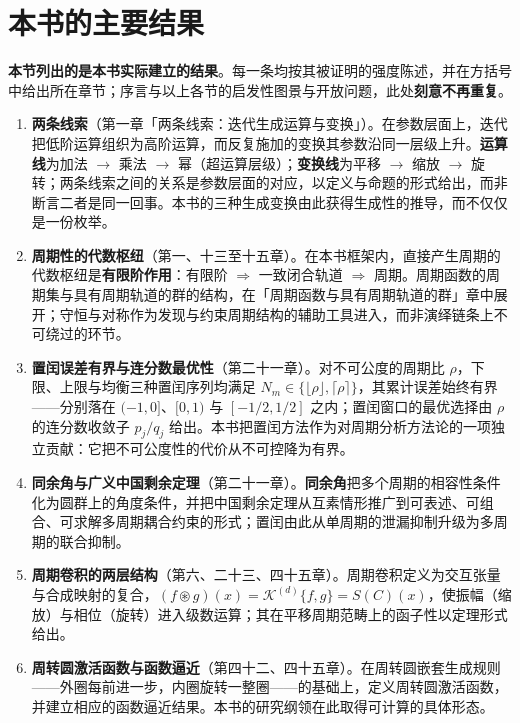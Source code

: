 \section*{本书的主要结果}

\textbf{本节列出的是本书实际建立的结果}。每一条均按其被证明的强度陈述，并在方括号中给出所在章节；序言与以上各节的启发性图景与开放问题，此处\textbf{刻意不再重复}。

\begin{enumerate}[leftmargin=4em, label={(\arabic*)}]
    \item \textbf{两条线索}（第一章「两条线索：迭代生成运算与变换」）。在参数层面上，迭代把低阶运算组织为高阶运算，而反复施加的变换其参数沿同一层级上升。\textbf{运算线}为加法 $\to$ 乘法 $\to$ 幂（超运算层级）；\textbf{变换线}为平移 $\to$ 缩放 $\to$ 旋转；两条线索之间的关系是参数层面的对应，以定义与命题的形式给出，而非断言二者是同一回事。本书的三种生成变换由此获得生成性的推导，而不仅仅是一份枚举。
    \item \textbf{周期性的代数枢纽}（第一、十三至十五章）。在本书框架内，直接产生周期的代数枢纽是\textbf{有限阶作用}：有限阶 $\Rightarrow$ 一致闭合轨道 $\Rightarrow$ 周期。周期函数的周期集与具有周期轨道的群的结构，在「周期函数与具有周期轨道的群」章中展开；守恒与对称作为发现与约束周期结构的辅助工具进入，而非演绎链条上不可绕过的环节。
    \item \textbf{置闰误差有界与连分数最优性}（第二十一章）。对不可公度的周期比 $\rho$，下限、上限与均衡三种置闰序列均满足 $N_m \in \{\lfloor\rho\rfloor, \lceil\rho\rceil\}$，其累计误差始终有界——分别落在 $(-1,0]$、$[0,1)$ 与 $[-1/2,1/2]$ 之内；置闰窗口的最优选择由 $\rho$ 的连分数收敛子 $p_j/q_j$ 给出。本书把置闰方法作为对周期分析方法论的一项独立贡献：它把不可公度性的代价从不可控降为有界。
    \item \textbf{同余角与广义中国剩余定理}（第二十一章）。\textbf{同余角}把多个周期的相容性条件化为圆群上的角度条件，并把中国剩余定理从互素情形推广到可表述、可组合、可求解多周期耦合约束的形式；置闰由此从单周期的泄漏抑制升级为多周期的联合抑制。
    \item \textbf{周期卷积的两层结构}（第六、二十三、四十五章）。周期卷积定义为交互张量与合成映射的复合，$(f\circledast g)(x) = \mathcal{K}^{(d)}\{f,g\} = S(C)(x)$，使振幅（缩放）与相位（旋转）进入级数运算；其在平移周期范畴上的函子性以定理形式给出。
    \item \textbf{周转圆激活函数与函数逼近}（第四十二、四十五章）。在周转圆嵌套生成规则——外圈每前进一步，内圈旋转一整圈——的基础上，定义周转圆激活函数，并建立相应的函数逼近结果。本书的研究纲领在此取得可计算的具体形态。
\end{enumerate}


